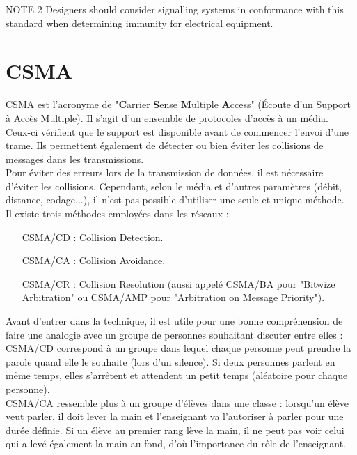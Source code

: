 \documentclass[11pt, a4paper, twoside]{book}
\begin{document}
NOTE 2 Designers should consider signalling systems in conformance with this standard when determining immunity for electrical equipment.

\chapter{CSMA}
CSMA est l’acronyme de "\textbf{C}arrier \textbf{S}ense \textbf{M}ultiple \textbf{A}ccess" (Écoute d'un Support à Accès Multiple). Il s'agit d'un ensemble de protocoles d'accès à un média. Ceux-ci vérifient que le support est disponible avant de commencer l'envoi d'une trame. Ils permettent également de détecter ou bien éviter les collisions de messages dans les transmissions.\\

Pour éviter des erreurs lors de la transmission de données, il est nécessaire d'éviter les collisions. Cependant, selon le média et d'autres paramètres (débit, distance, codage...), il n'est pas possible d'utiliser une seule et unique méthode.\\

Il existe trois méthodes employées dans les réseaux :
\begin{itemize}
\item[CSMA/CD] : Collision Detection.
\item[CSMA/CA] : Collision Avoidance.
\item[CSMA/CR] : Collision Resolution (aussi appelé CSMA/BA pour "Bitwize Arbitration" ou CSMA/AMP pour "Arbitration on Message Priority").
\end{itemize}
Avant d'entrer dans la technique, il est utile pour une bonne compréhension de faire une analogie avec un groupe de personnes souhaitant discuter entre elles :\\

CSMA/CD correspond à un groupe dans lequel chaque personne peut prendre la parole quand elle le souhaite (lors d'un silence). Si deux personnes parlent en même temps, elles s'arrêtent et attendent un petit temps (aléatoire pour chaque personne).\\

CSMA/CA ressemble plus à un groupe d'élèves dans une classe : lorsqu'un élève veut parler, il doit lever la main et l'enseignant va l'autoriser à parler pour une durée définie. Si un élève au premier rang lève la main, il ne peut pas voir celui qui a levé également la main au fond, d'où l'importance du rôle de l'enseignant.\\
\end{document}
